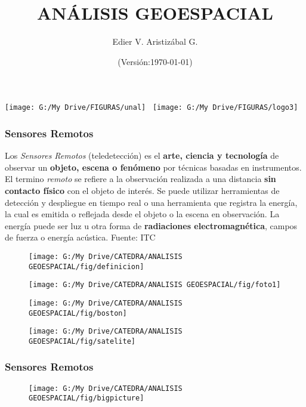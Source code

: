 \documentclass[14pt]{beamer}
\title[Sensores Remotos]{ANÁLISIS GEOESPACIAL}
\author[Edier Aristizábal]{Edier V. Aristizábal G.}
\institute{\emph{evaristizabalg@unal.edu.co}}
\date{(Versión:\today)}
\begin{document}
\begin{frame}
\titlepage
\centering
	\texttt{[image: G:/My Drive/FIGURAS/unal]}\hspace*{4.75cm}~%
   	\texttt{[image: G:/My Drive/FIGURAS/logo3]} 
\end{frame}
\begin{frame}
\frametitle{Sensores Remotos}
\scriptsize {Los \emph{Sensores Remotos} (teledetección) es el \textbf{arte, ciencia y tecnología} de observar un \textbf{objeto, escena o fenómeno} por técnicas basadas en instrumentos. El termino \emph{remoto} se refiere a la observación realizada a una distancia \textbf{sin contacto físico} con el objeto de interés. Se puede utilizar herramientas de detección y despliegue en tiempo real o una herramienta que registra la energía, la cual es emitida o reflejada desde el objeto o la escena en observación. La energía puede ser luz u otra forma de \textbf{radiaciones electromagnética}, campos de fuerza o energía acústica.}
\tiny{Fuente: ITC} 
  \begin{figure}
    \centering
    \texttt{[image: G:/My Drive/CATEDRA/ANALISIS GEOESPACIAL/fig/definicion]}
   \end{figure}
\end{frame}
\begin{frame}
  \begin{figure}
    \centering
    \texttt{[image: G:/My Drive/CATEDRA/ANALISIS GEOESPACIAL/fig/foto1]}
\tiny{}
 \end{figure}
\end{frame}
\begin{frame}
  \begin{figure}
    \centering
    \texttt{[image: G:/My Drive/CATEDRA/ANALISIS GEOESPACIAL/fig/boston]}
\tiny{}
 \end{figure}
\end{frame}
\begin{frame}
  \begin{figure}
    \centering
    \texttt{[image: G:/My Drive/CATEDRA/ANALISIS GEOESPACIAL/fig/satelite]}
\tiny{}
 \end{figure}
\end{frame}
\begin{frame}
\frametitle{Sensores Remotos}
  \begin{figure}
    \centering
    \texttt{[image: G:/My Drive/CATEDRA/ANALISIS GEOESPACIAL/fig/bigpicture]}
\tiny{}
 \end{figure}
\end{frame}
\end{document}
